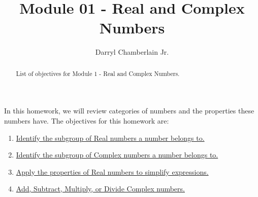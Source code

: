 \documentclass{ximera}
\author{Darryl Chamberlain Jr.}
\title{Module 01 - Real and Complex Numbers}
\begin{document}
\begin{abstract}
List of objectives for Module 1 - Real and Complex Numbers.
\end{abstract}
\maketitle

In this homework, we will review categories of numbers and the properties these numbers have. The objectives for this homework are: 
\begin{enumerate}
\item \href{https://cnx.org/contents/mwjClAV_@8.1:0KhpF2RH@23/Real-Numbers-Algebra-Essentials}{Identify the subgroup of Real numbers a number belongs to.}
\item \href{https://cnx.org/contents/mwjClAV_@8.1:Sqk1HAGf@9/Complex-Numbers}{Identify the subgroup of Complex numbers a number belongs to.}
\item \href{https://cnx.org/contents/mwjClAV_@8.1:0KhpF2RH@23/Real-Numbers-Algebra-Essentials}{Apply the properties of Real numbers to simplify expressions.}
\item \href{https://cnx.org/contents/mwjClAV_@8.1:Sqk1HAGf@9/Complex-Numbers}{Add, Subtract, Multiply, or Divide Complex numbers.}
\end{enumerate}
\end{document}
